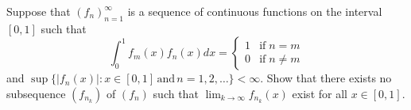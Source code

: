Suppose that $(f_{n})_{n=1}^{\infty}$ is a sequence of continuous functions on the interval $[0,1]$ such that
$$\int_{0}^{1}f_{m}(x)f_{n}(x) dx=
\begin{cases} 
1& \text{if}\;n=m\\
 0 & \text{if} \;n\ne m
\end{cases}$$and $\sup\{|f_{n}(x)|: x\in [0,1]\, \text{and}\, n=1,2,\dots\}< \infty$.
Show that there exists no subsequence $(f_{n_{k}})$ of $(f_{n})$ such that $\lim_{k\to \infty}f_{n_{k}}(x)$ exist
for all $x\in [0,1]$.